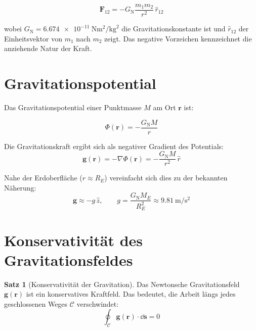 ﻿\documentclass[12pt, a4paper]{report}
\theoremstyle{definition}
\newtheorem{theorem}{Satz}[section]
\theoremstyle{remark}
\newcommand{\G}{G_{\text{N}}}          %
\newcommand{\vek}[1]{\boldsymbol{#1}}
\begin{document}
\begin{equation}
  \vek{F}_{12} = -\G \frac{m_1 m_2}{r^2}\,\hat{r}_{12}
  \label{eq:newton_grav}
\end{equation}

wobei $\G = \SI{6.674e-11}{\newton\metre\squared\per\kilogram\squared}$ die
Gravitationskonstante ist und $\hat{r}_{12}$ der Einheitsvektor von $m_1$ nach
$m_2$ zeigt. Das negative Vorzeichen kennzeichnet die anziehende Natur der Kraft.

\section{Gravitationspotential}

Das Gravitationspotential einer Punktmasse $M$ am Ort $\vek{r}$ ist:

\begin{equation}
  \Phi(\vek{r}) = -\frac{\G M}{r}
  \label{eq:grav_potential}
\end{equation}

Die Gravitationskraft ergibt sich als negativer Gradient des Potentials:
\begin{equation}
  \vek{g}(\vek{r}) = -\nabla\Phi(\vek{r}) = -\frac{\G M}{r^2}\,\hat{r}
  \label{eq:grav_feld}
\end{equation}

Nahe der Erdoberfläche ($r \approx R_E$) vereinfacht sich dies zu der bekannten
Näherung:
\begin{equation}
  \vek{g} \approx -g\,\hat{z}, \qquad g = \frac{\G M_E}{R_E^2} \approx
  \SI{9.81}{\metre\per\second\squared}
\end{equation}

\section{Konservativität des Gravitationsfeldes}

\begin{theorem}[Konservativität der Gravitation]
  \label{thm:konservativ}
  Das Newtonsche Gravitationsfeld $\vek{g}(\vek{r})$ ist ein konservatives
  Kraftfeld. Das bedeutet, die Arbeit längs jedes geschlossenen Weges $\mathcal{C}$
  verschwindet:
  \begin{equation}
    \oint_{\mathcal{C}} \vek{g}(\vek{r}) \cdot \dd\vek{s} = 0
    \label{eq:konservativ}
  \end{equation}
\end{theorem}
\end{document}
